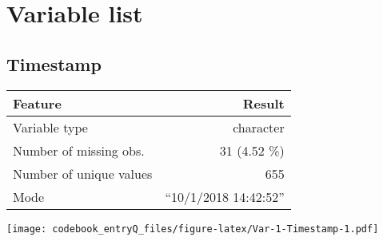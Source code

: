 \documentclass[]{article}
\newcommand{\bminione}{\begin{minipage}{0.75 \textwidth}}
\newcommand{\bminitwo}{\begin{minipage}{0.25 \textwidth}}
\newcommand{\emini}{\end{minipage}}
\begin{document}
\section{Variable list}\label{variable-list}

\hypertarget{timestamp}{\subsection{Timestamp}\label{timestamp}}

\bminione

\begin{longtable}[]{@{}lr@{}}
\toprule
\begin{minipage}[b]{0.34\columnwidth}\raggedright\strut
Feature\strut
\end{minipage} & \begin{minipage}[b]{0.29\columnwidth}\raggedleft\strut
Result\strut
\end{minipage}\tabularnewline
\midrule
\endhead
\begin{minipage}[t]{0.34\columnwidth}\raggedright\strut
Variable type\strut
\end{minipage} & \begin{minipage}[t]{0.29\columnwidth}\raggedleft\strut
character\strut
\end{minipage}\tabularnewline
\begin{minipage}[t]{0.34\columnwidth}\raggedright\strut
Number of missing obs.\strut
\end{minipage} & \begin{minipage}[t]{0.29\columnwidth}\raggedleft\strut
31 (4.52 \%)\strut
\end{minipage}\tabularnewline
\begin{minipage}[t]{0.34\columnwidth}\raggedright\strut
Number of unique values\strut
\end{minipage} & \begin{minipage}[t]{0.29\columnwidth}\raggedleft\strut
655\strut
\end{minipage}\tabularnewline
\begin{minipage}[t]{0.34\columnwidth}\raggedright\strut
Mode\strut
\end{minipage} & \begin{minipage}[t]{0.29\columnwidth}\raggedleft\strut
``10/1/2018 14:42:52''\strut
\end{minipage}\tabularnewline
\bottomrule
\end{longtable}

\emini
\bminitwo
\texttt{[image: codebook\_entryQ\_files/figure-latex/Var-1-Timestamp-1.pdf]}
\emini
\end{document}
